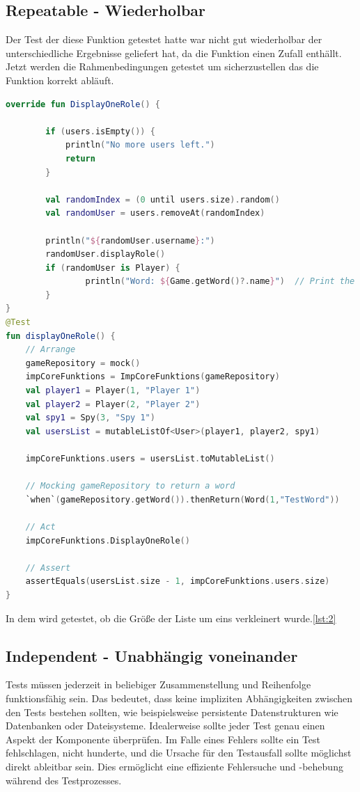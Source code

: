 \subsection*{Repeatable - Wiederholbar}
Der Test der diese Funktion getestet hatte war nicht gut wiederholbar der unterschiedliche Ergebnisse geliefert hat, da die Funktion einen Zufall enthällt. Jetzt werden die Rahmenbedingungen getestet um sicherzustellen das die Funktion korrekt abläuft.
\begin{lstlisting}[language=Kotlin, caption={Repetable}, label={lst:2}]
override fun DisplayOneRole() {

        if (users.isEmpty()) {
            println("No more users left.")
            return
        }

        val randomIndex = (0 until users.size).random()
        val randomUser = users.removeAt(randomIndex)

        println("${randomUser.username}:")
        randomUser.displayRole()
        if (randomUser is Player) {
                println("Word: ${Game.getWord()?.name}")  // Print the word if the user is a player and not a spy
        }
}
@Test
fun displayOneRole() {
    // Arrange
    gameRepository = mock()
    impCoreFunktions = ImpCoreFunktions(gameRepository)
    val player1 = Player(1, "Player 1")
    val player2 = Player(2, "Player 2")
    val spy1 = Spy(3, "Spy 1")
    val usersList = mutableListOf<User>(player1, player2, spy1)

    impCoreFunktions.users = usersList.toMutableList()

    // Mocking gameRepository to return a word
    `when`(gameRepository.getWord()).thenReturn(Word(1,"TestWord"))

    // Act
    impCoreFunktions.DisplayOneRole()

    // Assert
    assertEquals(usersList.size - 1, impCoreFunktions.users.size)
}
\end{lstlisting}
In dem wird getestet, ob die Größe der Liste um eins verkleinert wurde.\ref{lst:2}

\subsection*{Independent - Unabhängig voneinander}
Tests müssen jederzeit in beliebiger Zusammenstellung und Reihenfolge funktionsfähig sein. Das bedeutet, dass keine impliziten Abhängigkeiten zwischen den Tests bestehen sollten, wie beispielsweise persistente Datenstrukturen wie Datenbanken oder Dateisysteme. Idealerweise sollte jeder Test genau einen Aspekt der Komponente überprüfen. Im Falle eines Fehlers sollte ein Test fehlschlagen, nicht hunderte, und die Ursache für den Testausfall sollte möglichst direkt ableitbar sein. Dies ermöglicht eine effiziente Fehlersuche und -behebung während des Testprozesses.

